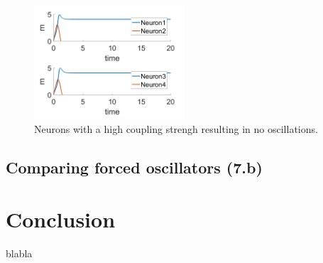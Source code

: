 \documentclass[a4paper]{scrartcl}
\begin{document}
\begin{figure}[!h]
	\centering
	\includegraphics[width=0.5\textwidth]{fig/kill.png}
	\caption{Neurons with a high coupling strengh resulting in no oscillations.}
\end{figure}

\subsection{Comparing forced oscillators (7.b)}


\newpage
\section{Conclusion}

blabla
\end{document}
